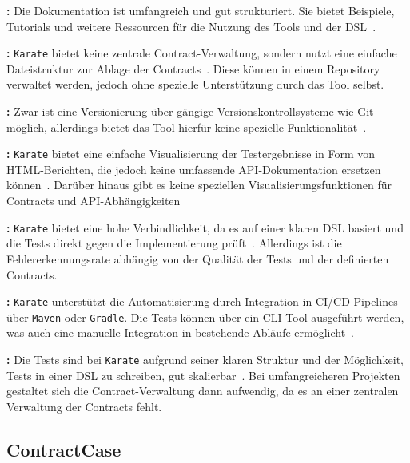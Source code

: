 \textbf{:} Die Dokumentation ist umfangreich und gut strukturiert.
Sie bietet Beispiele, Tutorials und weitere Ressourcen für die Nutzung des Tools und der \gls{DSL}~\cite{KaratelabsKarate2025}.

\textbf{:} \texttt{Karate} bietet keine zentrale Contract-Verwaltung, sondern nutzt eine einfache Dateistruktur zur Ablage der Contracts~\cite{KaratelabsKarate2025}.
Diese können in einem Repository verwaltet werden, jedoch ohne spezielle Unterstützung durch das Tool selbst.

\textbf{:} Zwar ist eine Versionierung über gängige Versionskontrollsysteme wie Git möglich, allerdings bietet das Tool hierfür keine spezielle Funktionalität~\cite{KaratelabsKarate2025}.

\textbf{:} \texttt{Karate} bietet eine einfache Visualisierung der Testergebnisse in Form von HTML-Berichten, die jedoch keine umfassende \gls{API}-Dokumentation ersetzen können~\cite{KaratelabsKarate2025}.
Darüber hinaus gibt es keine speziellen Visualisierungsfunktionen für Contracts und \gls{API}-Abhängigkeiten \oae

\textbf{:} \texttt{Karate} bietet eine hohe Verbindlichkeit, da es auf einer klaren \gls{DSL} basiert und die Tests direkt gegen die Implementierung prüft~\cite{KaratelabsKarate2025}.
Allerdings ist die Fehlererkennungsrate abhängig von der Qualität der Tests und der definierten Contracts.

\textbf{:} \texttt{Karate} unterstützt die Automatisierung durch Integration in \gls{CI}/\gls{CD}-\glspl{Pipeline} über \texttt{\gls{Maven}} oder \texttt{\gls{Gradle}}.
Die Tests können über ein \gls{CLI}-Tool ausgeführt werden, was auch eine manuelle Integration in bestehende Abläufe ermöglicht~\cite{KaratelabsKarate2025}.

\textbf{:} Die Tests sind bei \texttt{Karate} aufgrund seiner klaren Struktur und der Möglichkeit, Tests in einer \gls{DSL} zu schreiben, gut skalierbar~\cite{KaratelabsKarate2025}.
Bei umfangreicheren Projekten gestaltet sich die Contract-Verwaltung dann aufwendig, da es an einer zentralen Verwaltung der Contracts fehlt.


\subsection*{ContractCase}

